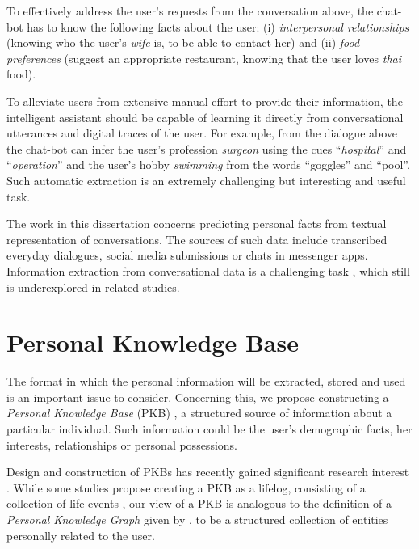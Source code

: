 To effectively address the user's requests from the conversation above, the chat-bot has to know the following facts about the user: (i) \textit{interpersonal relationships} (knowing who the user's \textit{wife} is, to be able to contact her) and (ii) \textit{food preferences} (suggest an appropriate restaurant, knowing that the user loves \textit{thai} food).

To alleviate users from extensive manual effort to provide their information, the intelligent assistant should be capable of learning it directly from conversational utterances and digital traces of the user. For example, from the dialogue above the chat-bot can infer the user's profession \textit{surgeon} using the cues ``\textit{hospital}'' and ``\textit{operation}'' and the user's hobby \textit{swimming} from the words ``goggles'' and ``pool''. Such automatic extraction is an extremely challenging but interesting and useful task.

The work in this dissertation concerns predicting personal facts from textual representation of conversations. The sources of such data include transcribed everyday dialogues, social media submissions or chats in messenger apps. Information extraction from conversational data is a challenging task \cite{wu2020getting, yen2019personal}, which still is underexplored in related studies. 

\section{Personal Knowledge Base}

The format in which the personal information will be extracted, stored and used is an important issue to consider. Concerning this, we propose constructing a \textit{Personal Knowledge Base} (PKB) \cite{balog2019personal, yen2019personal}, a structured source of information about a particular individual. Such information could be the user's demographic facts, her interests, relationships or personal possessions.%

Design and construction of PKBs has recently gained significant research interest \cite{vannur2020data, balog2019personal}. While some studies propose creating a PKB as a lifelog, consisting of a collection of life events \cite{yen2019personal, kao2021convlogminer}, our view of a PKB is analogous to the definition of a \textit{Personal Knowledge Graph} given by \citet{balog2019personal}, to be a structured collection of entities personally related to the user. 

